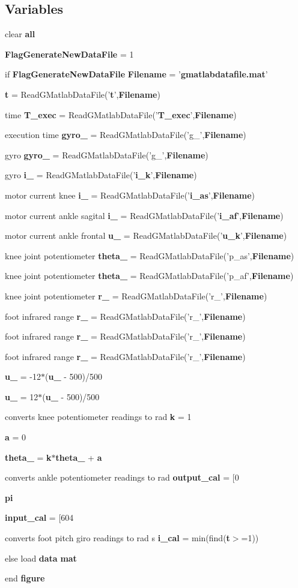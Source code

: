 \subsection*{Variables}
\begin{DoxyCompactItemize}
\item 
clear {\bf all}
\item 
{\bf FlagGenerateNewDataFile} = 1
\item 
if {\bf FlagGenerateNewDataFile} {\bf Filename} = '{\bf gmatlabdatafile.mat}'
\item 
{\bf t} = ReadGMatlabDataFile('{\bf t}',{\bf Filename})
\item 
time {\bf T\_\-exec} = ReadGMatlabDataFile('{\bf T\_\-exec}',{\bf Filename})
\item 
execution time {\bf gyro\_} = ReadGMatlabDataFile('g\_',{\bf Filename})
\item 
gyro {\bf gyro\_} = ReadGMatlabDataFile('g\_',{\bf Filename})
\item 
gyro {\bf i\_} = ReadGMatlabDataFile('{\bf i\_\-k}',{\bf Filename})
\item 
motor current knee {\bf i\_} = ReadGMatlabDataFile('{\bf i\_\-as}',{\bf Filename})
\item 
motor current ankle sagital {\bf i\_} = ReadGMatlabDataFile('{\bf i\_\-af}',{\bf Filename})
\item 
motor current ankle frontal {\bf u\_} = ReadGMatlabDataFile('{\bf u\_\-k}',{\bf Filename})
\item 
knee joint potentiometer {\bf theta\_} = ReadGMatlabDataFile('p\_\-as',{\bf Filename})
\item 
knee joint potentiometer {\bf theta\_} = ReadGMatlabDataFile('p\_\-af',{\bf Filename})
\item 
knee joint potentiometer {\bf r\_} = ReadGMatlabDataFile('r\_',{\bf Filename})
\item 
foot infrared range {\bf r\_} = ReadGMatlabDataFile('r\_',{\bf Filename})
\item 
foot infrared range {\bf r\_} = ReadGMatlabDataFile('r\_',{\bf Filename})
\item 
foot infrared range {\bf r\_} = ReadGMatlabDataFile('r\_',{\bf Filename})
\item 
{\bf u\_} = -\/12$\ast$({\bf u\_} -\/ 500)/500
\item 
{\bf u\_} = 12$\ast$({\bf u\_} -\/ 500)/500
\item 
converts knee potentiometer readings to rad {\bf k} = 1
\item 
{\bf a} = 0
\item 
{\bf theta\_} = {\bf k}$\ast${\bf theta\_} + {\bf a}
\item 
converts ankle potentiometer readings to rad {\bf output\_\-cal} = [0
\item 
{\bf pi}
\item 
{\bf input\_\-cal} = [604
\item 
converts foot pitch giro readings to rad s {\bf i\_\-cal} = min(find({\bf t}$>$=1))
\item 
else load {\bf data} {\bf mat}
\item 
end {\bf figure}
\end{DoxyCompactItemize}


